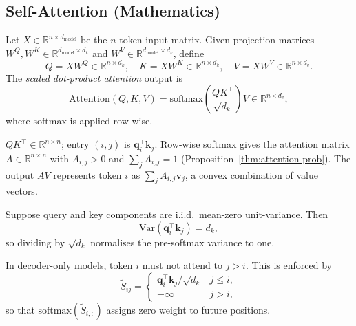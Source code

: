 \begin{deepdive}

\subsection{Self-Attention (Mathematics)}
\label{sec:transformer-selfattn}

\begin{definition}
\label{def:scaled-dot-product-attn}
Let $X \in \mathbb{R}^{n \times d_{\mathrm{model}}}$ be the $n$-token input matrix.
Given projection matrices
$W^Q, W^K \in \mathbb{R}^{d_{\mathrm{model}} \times d_k}$ and
$W^V \in \mathbb{R}^{d_{\mathrm{model}} \times d_v}$,
define
\begin{equation}
  Q = X W^Q \in \mathbb{R}^{n \times d_k},\quad
  K = X W^K \in \mathbb{R}^{n \times d_k},\quad
  V = X W^V \in \mathbb{R}^{n \times d_v}.
  \label{eq:qkv}
\end{equation}
The \emph{scaled dot-product attention} output is
\begin{equation}
  \mathrm{Attention}(Q, K, V)
  = \mathrm{softmax}\!\left(\frac{Q K^{\top}}{\sqrt{d_k}}\right) V
  \in \mathbb{R}^{n \times d_v},
  \label{eq:scaled-dot-product}
\end{equation}
where $\mathrm{softmax}$ is applied row-wise.
\end{definition}

$QK^{\top} \in \mathbb{R}^{n \times n}$; entry $(i,j)$ is
$\mathbf{q}_i^{\top}\mathbf{k}_j$.
Row-wise softmax gives the attention matrix
$A \in \mathbb{R}^{n \times n}$ with $A_{i,j} > 0$ and $\sum_j A_{i,j} = 1$
(Proposition~\ref{thm:attention-prob}).
The output $AV$ represents token $i$ as $\sum_j A_{i,j}\mathbf{v}_j$, a convex
combination of value vectors.

\begin{proposition}
\label{thm:sqrt-dk-scaling}
Suppose query and key components are i.i.d.\ mean-zero unit-variance.
Then
\begin{equation}
  \mathrm{Var}(\mathbf{q}_i^{\top} \mathbf{k}_j) = d_k,
  \label{eq:dot-product-var}
\end{equation}
so dividing by $\sqrt{d_k}$ normalises the pre-softmax variance to one.
\end{proposition}

In decoder-only models, token $i$ must not attend to $j > i$.
This is enforced by
\begin{equation}
  \tilde{S}_{ij} = \begin{cases}
    \mathbf{q}_i^{\top}\mathbf{k}_j/\sqrt{d_k} & j \leq i,\\
    -\infty & j > i,
  \end{cases}
  \label{eq:causal-mask}
\end{equation}
so that $\mathrm{softmax}(\tilde{S}_{i,:})$ assigns zero weight to future positions.


\end{deepdive}
